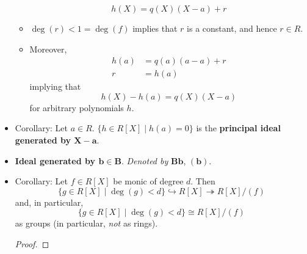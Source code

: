 \documentclass[../notes.tex]{subfiles}
\begin{document}
\begin{itemize}
\begin{itemize}
        \begin{equation*}
            h(X) = q(X)(X-a)+r
        \end{equation*}
        \item $\deg(r)<1=\deg(f)$ implies that $r$ is a constant, and hence $r\in R$.
        \item Moreover,
        \begin{align*}
            h(a) &= q(a)(a-a)+r\\
            r &= h(a)
        \end{align*}
        implying that
        \begin{equation*}
            h(X)-h(a) = q(X)(X-a)
        \end{equation*}
        for arbitrary polynomials $h$.
    \end{itemize}
    \item Corollary: Let $a\in R$. $\{h\in R[X]\mid h(a)=0\}$ is the \textbf{principal ideal generated by $\bm{X-a}$}.
    \item \textbf{Ideal generated by $\bm{b\in B}$}. \emph{Denoted by} $\bm{Bb}$, $\bm{(b)}$.
    \item Corollary: Let $f\in R[X]$ be monic of degree $d$. Then
    \begin{equation*}
        \{g\in R[X]\mid \deg(g)<d\} \hookrightarrow R[X]
        \twoheadrightarrow R[X]/(f)
    \end{equation*}
    and, in particular,
    \begin{equation*}
        \{g\in R[X]\mid \deg(g)<d\} \cong R[X]/(f)
    \end{equation*}
    as groups (in particular, \emph{not} as rings).
    \begin{proof}


\end{proof}
\end{itemize}
\end{document}
